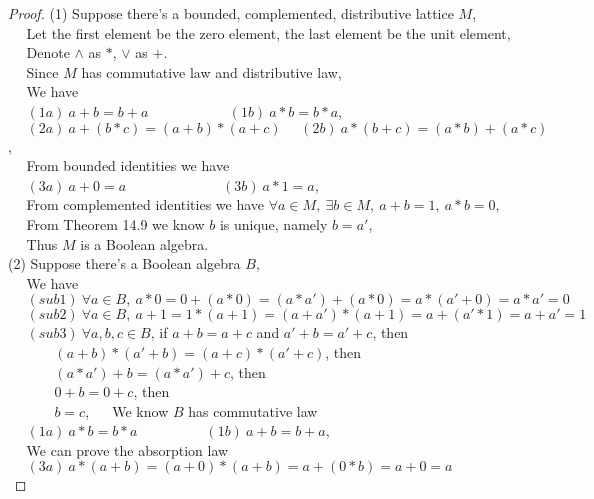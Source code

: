 \documentclass[11pt, a4paper, UTF8]{ctexart}
\begin{document}
\begin{proof}
  (1) Suppose there's a bounded, complemented, distributive lattice $M$,\\
  $~~~~~~$Let the first element be the zero element, the last element be the 
  unit element,\\
  $~~~~~~$Denote $\wedge$ as $*$, $\vee$ as $+$.\\
  $~~~~~~$Since $M$ has commutative law and distributive law,\\
  $~~~~~~$We have\\
  $~~~~~~(1a)~a + b = b + a~~~~~~~~~~~~~~~~~~~~~~~~~~(1b)~a * b = b * a$,\\
  $~~~~~~(2a)~a + (b * c) = (a + b) * (a + c)~~~~~~(2b)~a * (b + c) = (a * b) + (a * c)$,\\
  $~~~~~~$From bounded identities we have\\
  $~~~~~~(3a)~a + 0 = a~~~~~~~~~~~~~~~~~~~~~~~~~~~~~~~(3b)~a * 1 = a$,\\
  $~~~~~~$From complemented identities we have $\forall a \in M,~\exists b \in M,~a + b = 1,~a * b = 0$,\\
  $~~~~~~$From Theorem 14.9 we know $b$ is unique, namely $b = a'$,\\
  $~~~~~~$Thus $M$ is a Boolean algebra.\\
  (2) Suppose there's a Boolean algebra $B$,\\
  $~~~~~~$We have\\
  $~~~~~~(sub1)~\forall a \in B,~a * 0 = 0 + (a * 0) = (a * a') + (a * 0) = a * (a' + 0) = a * a' = 0$\\
  $~~~~~~(sub2)~\forall a \in B,~a + 1 = 1 * (a + 1) = (a + a') * (a + 1) = a + (a' * 1) = a + a' = 1$\\
  $~~~~~~(sub3)~\forall a,b,c \in B$, if $a + b = a + c$ and $a' + b = a' + c$, then\\
  $~~~~~~~~~~~~~~~(a + b) * (a' + b) = (a + c) * (a' + c)$, then\\
  $~~~~~~~~~~~~~~~(a * a') + b = (a * a') + c$, then\\
  $~~~~~~~~~~~~~~~0 + b = 0 + c$, then\\
  $~~~~~~~~~~~~~~~b = c$,
  $~~~~~~$We know $B$ has commutative law\\
  $~~~~~~(1a)~a * b = b * a~~~~~~~~~~~~~~~~~~~~~~(1b)~a + b = b + a$,\\
  $~~~~~~$We can prove the absorption law\\
  $~~~~~~(3a)~a * (a + b) = (a + 0) * (a + b) = a + (0 * b) = a + 0 = a$\\

\end{proof}
\end{document}
